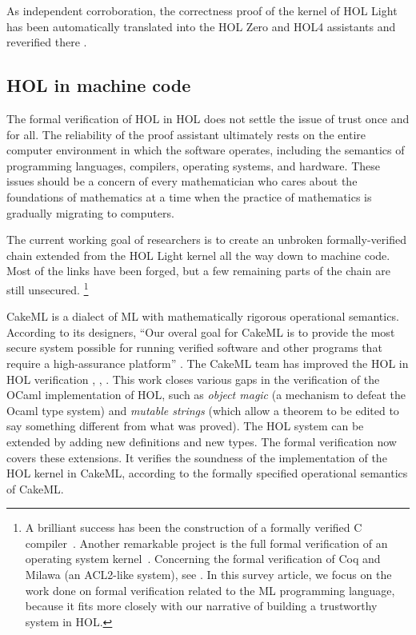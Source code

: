 \documentclass[brochure,english,12pt]{bourbaki}
\theoremstyle{plain}
\begin{document}
As independent corroboration, the correctness proof of the kernel of HOL Light 
has been automatically translated into the HOL Zero and HOL4 assistants
and reverified there \cite{adams2010introducing}.


\subsection{HOL in machine code}

The formal verification of HOL in HOL does not settle the issue of trust once and for all.
The reliability of the proof assistant ultimately
rests on the entire computer environment in which the software operates, 
including the semantics of programming languages,
compilers, operating systems, and hardware.  These issues should be a concern of
every mathematician who cares about the foundations of mathematics at a time when
the practice of mathematics is gradually migrating to  computers.


 The current working goal of researchers is to create an unbroken formally-verified chain extended from the
HOL Light kernel all the way down to machine code.  Most of the links have been forged, but a few
remaining parts of the chain
are still unsecured.  
\footnote{A brilliant success has been the construction of a formally verified C compiler~\cite{CC}. Another remarkable
project is the full formal verification of an operating system kernel~\cite{sel4}.  
Concerning the formal verification of  Coq and Milawa (an ACL2-like system), see
\cite{barras2010sets} \cite{myreen2012reflective}.
In this survey article,
we focus on the work done on formal verification related to the ML programming language, because it fits more closely
with our narrative of building a trustworthy system in HOL.}

CakeML
is a dialect of ML with mathematically rigorous operational semantics.  
    According to its designers, ``Our overal goal for CakeML
is to provide the most secure system possible for running verified software and other programs that require a high-assurance
platform'' \cite{CakeML}.
The CakeML team has improved the HOL in HOL verification \cite{myreen2013steps}, \cite{myreen2013proof}, 
\cite{kumar2014hol}.  This work closes various gaps in the verification of the OCaml implementation of HOL, such
as {\it object magic} (a mechanism to defeat the Ocaml type system)  and {\it mutable strings} (which allow a theorem
to be edited to say something different from what was proved).  The HOL system can be extended by adding new definitions
and new types.  The formal verification now covers these extensions.
It verifies the soundness of the implementation of the HOL kernel in CakeML, according to the formally specified 
operational semantics of CakeML.  
\end{document}

